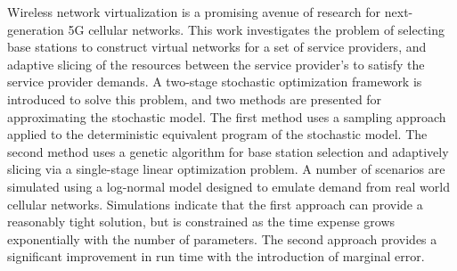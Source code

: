 \documentclass[12pt,dvipsnames]{report}
\begin{document}

Wireless network virtualization is a promising avenue of research for next-generation 5G cellular networks.  This work investigates the problem of selecting base stations to construct virtual networks for a set of service providers, and adaptive slicing of the resources between the service provider's to satisfy the service provider demands.  A two-stage stochastic optimization framework is introduced to solve this problem, and two methods are presented for approximating the stochastic model.  The first method uses a sampling approach applied to the deterministic equivalent program of the stochastic model.  The second method uses a genetic algorithm for base station selection and adaptively slicing via a single-stage linear optimization problem.  A number of scenarios are simulated using a log-normal model designed to emulate demand from real world cellular networks.  Simulations indicate that the first approach can provide a reasonably tight solution, but is constrained as the time expense grows exponentially with the number of parameters.  The second approach provides a significant improvement in run time with the introduction of marginal error.
\end{document}

